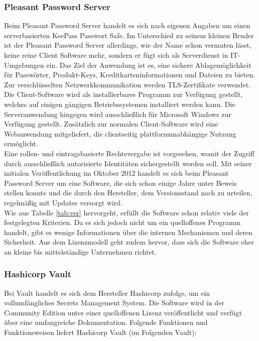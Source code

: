 \documentclass[
book,
a4paper,   
titlepage,  
halfparskip,
12pt        
]{scrartcl}
\begin{document}
\begin{onehalfspacing}
\subsubsection{Pleasant Password Server}
Beim Pleasant Password Server handelt es sich nach eigenen Angaben um einen serverbasierten KeePass Passwort Safe\cite{pleasant}. Im Unterschied zu seinem kleinen Bruder ist der Pleasant Password Server allerdings, wie der Name schon vermuten lässt, keine reine Client Software mehr, sondern er fügt sich als Serverdienst in \ac{IT}-Umgebungen ein. Das Ziel der Anwendung ist es, eine sichere Ablagemöglichkeit für Passwörter, Produkt-Keys, Kreditkarteninformationen und Dateien zu bieten. Zur verschlüsselten Netzwerkkommunikation werden \ac{TLS}-Zertifikate verwendet. Die Client-Software wird als installierbares Programm zur Verfügung gestellt, welches auf einigen gängigen Betriebssystemen installiert werden kann. Die Serveranwendung hingegen wird ausschließlich für Microsoft Windows zur Verfügung gestellt. Zusätzlich zur normalen Client-Software wird eine Webanwendung mitgeliefert, die clientseitig plattformunabhängige Nutzung ermöglicht.\cite{pleasant}\\
Eine rollen- und eintragsbasierte Rechtevergabe ist vorgesehen, womit der Zugriff durch ausschließlich autorisierte Identitäten sichergestellt werden soll. Mit seiner initialen Veröffentlichung im Oktober 2012 handelt es sich beim Pleasant Password Server um eine Software, die sich schon einige Jahre unter Beweis stellen konnte und die durch den Hersteller, dem Versionsstand nach zu urteilen, regelmäßig mit Updates versorgt wird.\cite{pleasant}\\
Wie aus Tabelle \vref{tab:ver} hervorgeht, erfüllt die Software schon relativ viele der festgelegten Kriterien. Da es sich jedoch nicht um ein quelloffenes Programm handelt, gibt es wenige Informationen über die internen Mechanismen und deren Sicherheit. Aus dem Lizenzmodell geht zudem hervor, dass sich die Software eher an kleine bis mittelständige Unternehmen richtet.

\subsubsection{Hashicorp Vault}
\label{subsubsec:vault}
Bei Vault handelt es sich dem Hersteller Hashicorp zufolge, um ein vollumfängliches Secrets Management System. Die Software wird in der Community Edition unter einer quelloffenen Lizenz veröffentlicht und verfügt über eine umfangreiche Dokumentation. Folgende Funktionen und Funktionsweisen liefert Hashicorp Vault (im Folgenden Vault):\cite{vaultintro}


\end{onehalfspacing}
\end{document}
